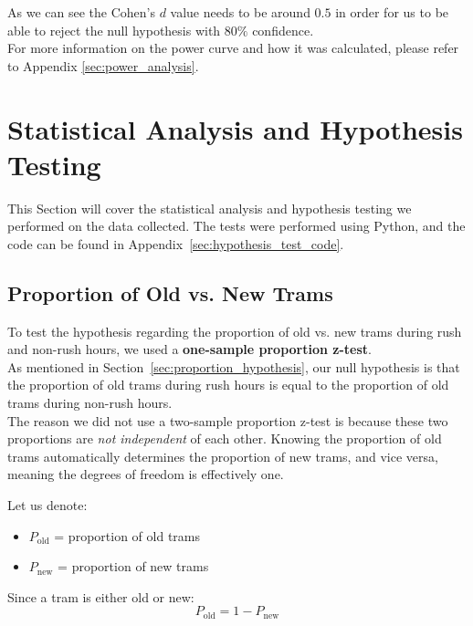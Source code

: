 \documentclass[a4paper, 10pt]{article}
\begin{document}
				\noindent As we can see the Cohen's $d$ value needs to be around $0.5$ in order for us to be able to reject the null 
				hypothesis with $80\%$ confidence. \\

				\noindent For more information on the power curve and how it was calculated, please refer to Appendix \ref{sec:power_analysis}.


	\section{Statistical Analysis and Hypothesis Testing}
		This Section will cover the statistical analysis and hypothesis testing we performed on the data collected. 
		The tests were performed using Python, and the code can be found in Appendix~\ref{sec:hypothesis_test_code}. \\

		\subsection{Proportion of Old vs. New Trams}
			\noindent To test the hypothesis regarding the proportion of old vs. new trams during 
			rush and non-rush hours, we used a \textbf{one-sample proportion z-test}. \\

			\noindent As mentioned in Section~\ref{sec:proportion_hypothesis}, our null hypothesis is that the proportion of old trams 
			during rush hours is equal to the proportion of old trams during non-rush hours. \\

			\noindent The reason we did not use a two-sample proportion z-test is because these two proportions are 
			\textit{not independent} of each other. Knowing the proportion of old trams automatically 
			determines the proportion of new trams, and vice versa, meaning the degrees of freedom is effectively one. \\
			\newpage

			\noindent Let us denote:
			\begin{itemize}
					\item \( P_{\text{old}} \) = proportion of old trams
					\item \( P_{\text{new}} \) = proportion of new trams
			\end{itemize}

			Since a tram is either old or new:
			\[
			P_{\text{old}} = 1 - P_{\text{new}}
			\]
\end{document}
